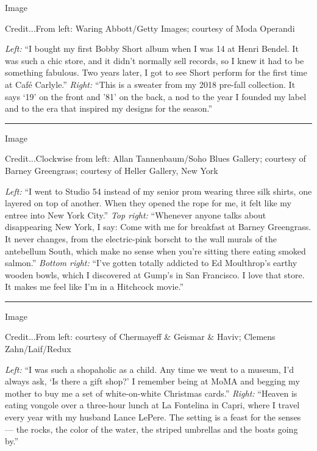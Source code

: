 Image

Credit...From left: Waring Abbott/Getty Images; courtesy of Moda
Operandi

\emph{Left:} ``I bought my first Bobby Short album when I was 14 at
Henri Bendel. It was such a chic store, and it didn't normally sell
records, so I knew it had to be something fabulous. Two years later, I
got to see Short perform for the first time at Café Carlyle.''
\emph{Right:} ``This is a sweater from my 2018 pre-fall collection. It
says `19' on the front and '81' on the back, a nod to the year I founded
my label and to the era that inspired my designs for the season.''

\begin{center}\rule{0.5\linewidth}{\linethickness}\end{center}

Image

Credit...Clockwise from left: Allan Tannenbaum/Soho Blues Gallery;
courtesy of Barney Greengrass; courtesy of Heller Gallery, New York

\emph{Left:} ``I went to Studio 54 instead of my senior prom wearing
three silk shirts, one layered on top of another. When they opened the
rope for me, it felt like my entree into New York City.'' \emph{Top
right:} ``Whenever anyone talks about disappearing New York, I say: Come
with me for breakfast at Barney Greengrass. It never changes, from the
electric-pink borscht to the wall murals of the antebellum South, which
make no sense when you're sitting there eating smoked salmon.''
\emph{Bottom right:} ``I've gotten totally addicted to Ed Moulthrop's
earthy wooden bowls, which I discovered at Gump's in San Francisco. I
love that store. It makes me feel like I'm in a Hitchcock movie.''

\begin{center}\rule{0.5\linewidth}{\linethickness}\end{center}

Image

Credit...From left: courtesy of Chermayeff \& Geismar \& Haviv; Clemens
Zahn/Laif/Redux

\emph{Left:} ``I was such a shopaholic as a child. Any time we went to a
museum, I'd always ask, `Is there a gift shop?' I remember being at MoMA
and begging my mother to buy me a set of white-on-white Christmas
cards.'' \emph{Right:} ``Heaven is eating vongole over a three-hour
lunch at La Fontelina in Capri, where I travel every year with my
husband Lance LePere. The setting is a feast for the senses --- the
rocks, the color of the water, the striped umbrellas and the boats going
by.''


